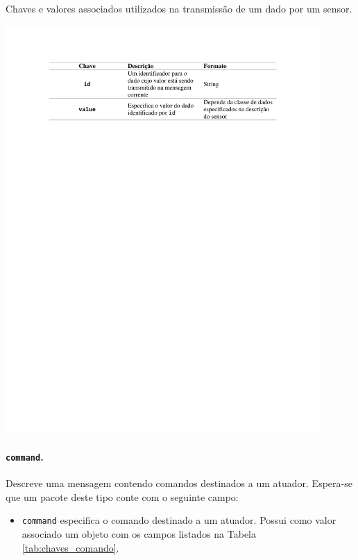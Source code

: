 \begin{table}[h]
	\centering
	\caption{Chaves e valores associados utilizados na transmissão de um dado por um sensor.}\smallskip
	\label{tab:chaves_dado}
	\includegraphics[width=0.9\textwidth]{tabelas/chaves_dado.pdf}
\end{table}

\paragraph*{\texttt{command}.} Descreve uma mensagem contendo comandos destinados a um atuador. Espera-se que um pacote deste tipo conte com o seguinte campo:
\begin{itemize}
	\item \texttt{command} especifica o comando destinado a um atuador. Possui como valor associado um objeto com os campos listados na Tabela \ref{tab:chaves_comando}.
\end{itemize}

